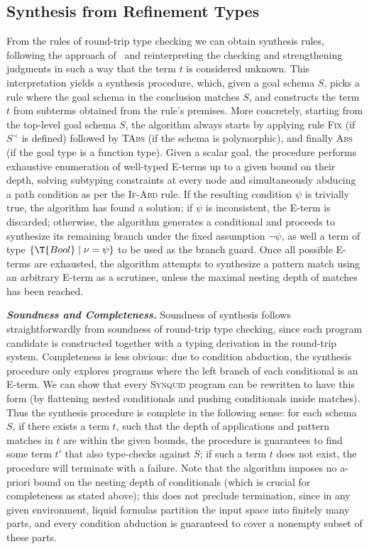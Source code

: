 \documentclass[10pt,preprint]{sigplanconf-pldi16}
\theoremstyle{definition}
\newcommand{\custompar}[1]{\parskip 0pt \textbf{\textit{#1}}}
\newcommand{\before}{\prec}
\newcommand{\lang}{\textsc{Synquid}\xspace}
\begin{document}
\subsection{Synthesis from Refinement Types}\label{sec:theory:synthesis}

From the rules of round-trip type checking we can obtain synthesis rules, following the approach of~\cite{OseraZd15}
and reinterpreting the checking and strengthening judgments
in such a way that the term $t$ is considered unknown.
This interpretation yields a synthesis procedure,
which, given a goal schema $S$, picks a rule where the goal schema in the conclusion matches $S$,
and constructs the term $t$ from subterms obtained from the rule's premises.
More concretely, starting from the top-level goal schema $S$,
the algorithm always starts by applying rule \textsc{Fix} (if $S^\before$ is defined)
followed by \textsc{TAbs} (if the schema is polymorphic),
and finally \textsc{Abs} (if the goal type is a function type).
Given a scalar goal,
the procedure performs exhaustive enumeration of well-typed E-terms up to a given bound on their depth,
solving subtyping constraints at every node and
simultaneously abducing a path condition as per the \textsc{If-Abd} rule.
If the resulting condition $\psi$ is trivially true, the algorithm has found a solution;
if $\psi$ is inconsistent, the E-term is discarded;
otherwise, the algorithm generates a conditional 
and proceeds to synthesize its remaining branch under the fixed assumption $\neg\psi$,
as well a term of type $\{\T{Bool}\mid \nu=\psi\}$ to be used as the branch guard.
Once all possible E-terms are exhausted,
the algorithm attempts to synthesize a pattern match using an arbitrary E-term as a scrutinee,
unless the maximal nesting depth of matches has been reached.

\custompar{Soundness and Completeness.}
Soundness of synthesis follows straightforwardly from soundness of round-trip type checking, 
since each program candidate is constructed together with a typing derivation in the round-trip system.
Completeness is less obvious:
due to condition abduction, the synthesis procedure only explores programs
where the left branch of each conditional is an E-term.
We can show that every \lang program can be rewritten to have this form
(by flattening nested conditionals and pushing conditionals inside matches).
Thus the synthesis procedure is complete in the following sense: 
for each schema $S$, if there exists a term $t$,
such that the depth of applications and pattern matches in $t$ are within the given bounds,
the procedure is guarantees to find some term $t'$ that also type-checks against $S$;
if such a term $t$ does not exist, the procedure will terminate with a failure.
Note that the algorithm imposes no a-priori bound on the nesting depth of conditionals
(which is crucial for completeness as stated above);
this does not preclude termination,
since in any given environment, liquid formulas partition the input space into finitely many parts,
and every condition abduction is guaranteed to cover a nonempty subset of these parts.
\end{document}
